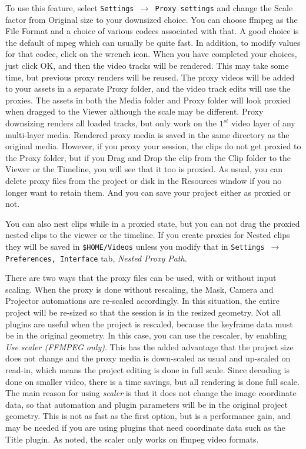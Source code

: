 To use this feature, select \texttt{Settings $\rightarrow$ Proxy settings} and change the Scale factor from Original size to your downsized choice.  You can choose ffmpeg as the File Format and a choice of various codecs associated with that.  A good choice is the default of mpeg which can usually be quite fast.  In addition, to modify values for that codec, click on the wrench icon.  When you have completed your choices, just click OK, and then the video tracks will be rendered. This may take some time, but previous proxy renders will be reused.  
The proxy videos will be added to your assets in a separate Proxy folder, and the video track edits will use the proxies.
The assets in both the Media folder and Proxy folder will look proxied when dragged to the Viewer although the scale may be different.
Proxy downsizing renders all loaded tracks, but only work on the $1^{st}$ video layer of any multi-layer media.  Rendered proxy media is saved in the same directory as the original media.
However, if you proxy your session, the clips do not get proxied to the Proxy folder, but if you Drag and Drop the clip from the Clip folder to the Viewer or the Timeline, you will see that it too is proxied.  
As usual, you can delete proxy files from the project or disk in the Resources window if you no longer want to retain them.
And you can save your project either as proxied or not.

You can also nest clips while in a proxied state, but you can not drag the proxied nested clips
to the viewer or the timeline.
If you create proxies for Nested clips they will be saved in \texttt{\$HOME/Videos} unless you modify that in
\texttt{Settings $\rightarrow$ Preferences, Interface} tab, \textit{Nested Proxy Path}. 

There are two ways that the proxy files can be used, with or without input scaling. When the proxy is done without rescaling, the Mask, Camera and Projector automations are re-scaled accordingly. In this situation, the entire project will be re-sized so that the session is in the resized geometry.  Not all plugins are useful when the project is rescaled, because the keyframe data must be in the original geometry.  In this case, you can use the rescaler, by enabling \textit{Use scaler (FFMPEG only)}. This has the added advantage that the project size does not change and the proxy media is down-scaled as usual and up-scaled on read-in, which means the project editing is done in full scale.   Since decoding is done on smaller video, there is a time savings, but all rendering is done full scale.  The main reason for using \textit{scaler} is that it does not change the image coordinate data, so that automation and plugin parameters will be in the original project geometry.   This is not as fast as the first option, but is a performance gain, and may be needed if you are using plugins that need coordinate data such as the Title plugin.  As noted, the scaler only works on ffmpeg video formats.

